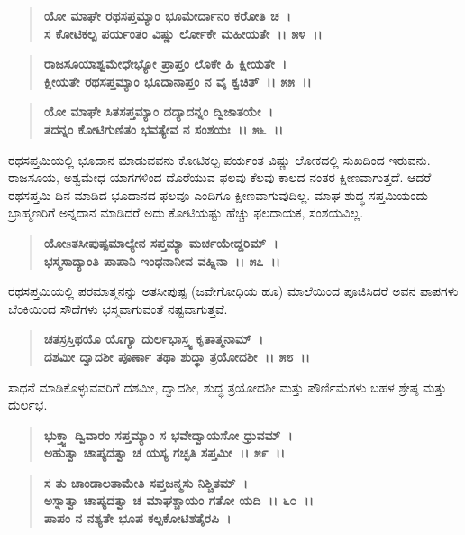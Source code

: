 \begin{verse}
\textbf{ಯೋ ಮಾಘೇ ರಥಸಪ್ತಮ್ಯಾಂ ಭೂಮೇರ್ದಾನಂ ಕರೋತಿ ಚ~।}\\\textbf{ಸ ಕೋಟಿಕಲ್ಪ ಪರ್ಯಂತಂ ವಿಷ್ಣು ರ್ಲೋಕೇ ಮಹೀಯತೇ~।। ೫೪~।।}
\end{verse}

\begin{verse}
\textbf{ರಾಜಸೂಯಾಶ್ವಮೇಧೇಭ್ಯೋ ಪ್ರಾಪ್ತಂ ಲೊಕೇ ಹಿ ಕ್ಷೀಯತೇ~।}\\\textbf{ಕ್ಷೀಯತೇ ರಥಸಪ್ತಮ್ಯಾಂ ಭೂದಾನಾಪ್ತಂ ನ ವೈ ಕ್ವಚಿತ್~।। ೫೫~।। }
\end{verse}

\begin{verse}
\textbf{ಯೋ ಮಾಘೇ ಸಿತಸಪ್ತಮ್ಯಾಂ ದದ್ಯಾದನ್ನಂ ದ್ವಿಜಾತಯೇ~।}\\\textbf{ತದನ್ನಂ ಕೋಟಿಗುಣಿತಂ ಭವತ್ಯೇವ ನ ಸಂಶಯಃ~।। ೫೬~।।}
\end{verse}

ರಥಸಪ್ತಮಿಯಲ್ಲಿ ಭೂದಾನ ಮಾಡುವವನು ಕೋಟಿಕಲ್ಪ ಪರ್ಯಂತ ವಿಷ್ಣು ಲೋಕದಲ್ಲಿ ಸುಖದಿಂದ ಇರುವನು. ರಾಜಸೂಯ, ಅಶ್ವಮೇಧ ಯಾಗಗಳಿಂದ ದೊರೆಯುವ ಫಲವು ಕೆಲವು ಕಾಲದ ನಂತರ ಕ್ಷೀಣವಾಗುತ್ತದೆ. ಆದರೆ ರಥಸಪ್ತಮಿ ದಿನ ಮಾಡಿದ ಭೂದಾನದ ಫಲವೂ ಎಂದಿಗೂ ಕ್ಷೀಣವಾಗುವುದಿಲ್ಲ. ಮಾಘ ಶುದ್ಧ ಸಪ್ತಮಿಯಂದು ಬ್ರಾಹ್ಮಣರಿಗೆ ಅನ್ನದಾನ ಮಾಡಿದರೆ ಅದು ಕೋಟಿಯಷ್ಟು ಹೆಚ್ಚು ಫಲದಾಯಕ, ಸಂಶಯವಿಲ್ಲ.

\begin{verse}
\textbf{ಯೋsತಸೀಪುಷ್ಪಮಾಲ್ಯೇನ ಸಪ್ತಮ್ಯಾ ಮರ್ಚಯೇದ್ದರಿಮ್~।}\\\textbf{ಭಸ್ಮಸಾದ್ಯಾಂತಿ ಪಾಪಾನಿ ಇಂಧನಾನೀವ ವಹ್ನಿನಾ~।। ೫೭~।।}
\end{verse}

ರಥಸಪ್ತಮಿಯಲ್ಲಿ ಪರಮಾತ್ಮನನ್ನು ಅತಸೀಪುಷ್ಪ (ಜವೇಗೋಧಿಯ ಹೂ) ಮಾಲೆಯಿಂದ ಪೂಜಿಸಿದರೆ ಅವನ ಪಾಪಗಳು ಬೆಂಕಿಯಿಂದ ಸೌದೆಗಳು ಭಸ್ಮವಾಗುವಂತೆ ನಷ್ಟವಾಗುತ್ತವೆ.

\begin{verse}
\textbf{ಚತಸ್ರಸ್ತಿಥಯೊ ಯೊಗ್ಯಾ ದುರ್ಲಭಾಸ್ತ್ವ ಕೃತಾತ್ಮನಾಮ್~।}\\\textbf{ದಶಮೀ ದ್ವಾದಶೀ ಪೂರ್ಣಾ ತಥಾ ಶುದ್ಧಾ ತ್ರಯೋದಶೀ~।। ೫೮~।।}
\end{verse}

ಸಾಧನೆ ಮಾಡಿಕೊಳ್ಳುವವರಿಗೆ ದಶಮೀ, ದ್ವಾದಶೀ, ಶುದ್ಧ ತ್ರಯೋದಶೀ ಮತ್ತು ಪೌರ್ಣಿಮೆಗಳು ಬಹಳ ಶ್ರೇಷ್ಠ ಮತ್ತು ದುರ್ಲಭ.

\begin{verse}
\textbf{ಭುಕ್ತ್ವಾ ದ್ವಿವಾರಂ ಸಪ್ತಮ್ಯಾಂ ಸ ಭವೇದ್ವಾಯಸೋ ಧ್ರುವಮ್~।}\\\textbf{ಅಹುತ್ವಾ ಚಾಪ್ಯದತ್ವಾ ಚ ಯಸ್ಯ ಗಚ್ಛತಿ ಸಪ್ತಮೀ~।। ೫೯~।।}
\end{verse}

\begin{verse}
\textbf{ಸ ತು ಚಾಂಡಾಲತಾಮೇತಿ ಸಪ್ತಜನ್ಮಸು ನಿಶ್ಚಿತಮ್~।}\\\textbf{ಅಸ್ನಾತ್ವಾ ಚಾಪ್ಯದತ್ವಾ ಚ ಮಾಘಶ್ಚಾಯಂ ಗತೋ ಯದಿ~।। ೬೦~।। }\\\textbf{ಪಾಪಂ ನ ನಶ್ಯತೇ ಭೂಪ ಕಲ್ಪಕೋಟಿಶತೈರಪಿ~।}
\end{verse}

